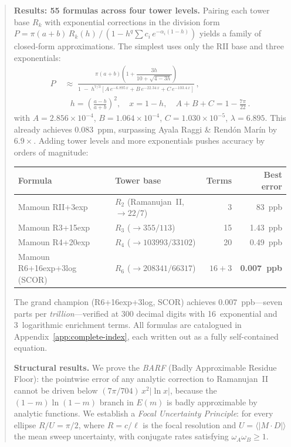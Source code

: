 \documentclass[12pt]{article}
\begin{document}
\begin{abstract}
\medskip
\noindent\textbf{Results: 55 formulas across four tower levels.}
Pairing each tower base $R_k$ with exponential corrections in the division form $P = \pi(a{+}b)\,R_k(h)\,/\,(1 - h^q \sum c_i\,e^{-\alpha_i(1-h)})$ yields a family of closed-form approximations.  The simplest uses only the RII base and three exponentials:
\begin{equation}\label{eq:headline}
\boxed{\begin{aligned}
P &\;\approx\; \frac{\pi(a{+}b)\!\left(1 + \dfrac{3h}{10+\sqrt{4-3h}}\right)}{1 \;-\; h^{7/3}\!\left[A\,e^{-6.895\,x} + B\,e^{-22.34\,x} + C\,e^{-103.4\,x}\right]}\,,\\[6pt]
&\quad h = \left(\tfrac{a-b}{a+b}\right)^{\!2},\quad x = 1{-}h,\quad A{+}B{+}C = 1 - \tfrac{7\pi}{22}\,.
\end{aligned}}
\end{equation}
with $A = 2.856{\times}10^{-4}$, $B = 1.064{\times}10^{-4}$, $C = 1.030{\times}10^{-5}$, $\lambda = 6.895$.
This already achieves $0.083$~ppm, surpassing Ayala Raggi \& Rend\'on Mar\'in by $6.9\times$.  Adding tower levels and more exponentials pushes accuracy by orders of magnitude:
\begin{center}
\begin{tabular}{l l r r}
\toprule
Formula & Tower base & Terms & Best error \\
\midrule
Mamoun RII+3exp & $R_2$ (Ramanujan~II, $\to 22/7$) & 3 & 83~ppb \\
Mamoun R3+15exp & $R_3$ ($\to 355/113$) & 15 & 1.43~ppb \\
Mamoun R4+20exp & $R_4$ ($\to 103993/33102$) & 20 & 0.49~ppb \\
Mamoun R6+16exp+3log (SCOR) & $R_6$ ($\to 208341/66317$) & $16{+}3$ & \textbf{0.007~ppb} \\
\bottomrule
\end{tabular}
\end{center}
\noindent The grand champion (R6+16exp+3log, SCOR) achieves $0.007$~ppb---seven parts per \emph{trillion}---verified at 300 decimal digits with 16~exponential and 3~logarithmic enrichment terms.  All formulas are catalogued in Appendix~\ref{app:complete-index}, each written out as a fully self-contained equation.

\medskip
\noindent\textbf{Structural results.}
We prove the \emph{BARF} (Badly Approximable Residue Floor): the pointwise error of any analytic correction to Ramanujan~II cannot be driven below $(7\pi/704)\,x^2|\!\ln x|$, because the $(1{-}m)\ln(1{-}m)$ branch in $E(m)$ is badly approximable by analytic functions.
We establish a \emph{Focal Uncertainty Principle}: for every ellipse $R/U = \pi/2$, where $R = c/\ell$ is the focal resolution and $U = \langle|M\!\cdot\!D|\rangle$ the mean sweep uncertainty, with conjugate rates satisfying $\omega_A\omega_B \geq 1$.


\end{abstract}
\end{document}
